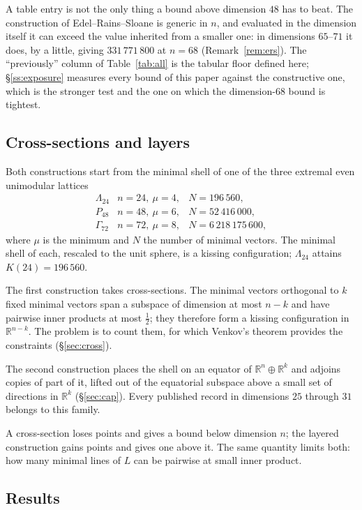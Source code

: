 \documentclass[11pt]{amsart}
\theoremstyle{remark}
\newcommand{\Leech}{\Lambda_{24}}
\newcommand{\Pff}{P_{48}}
\newcommand{\Gsz}{\Gamma_{72}}
\newcommand{\R}{\mathbb{R}}
\begin{document}
A table entry is not the only thing a bound above dimension $48$ has to beat. The
construction of Edel--Rains--Sloane is generic in $n$, and evaluated in the dimension
itself it can exceed the value inherited from a smaller one: in dimensions $65$--$71$
it does, by a little, giving $331\,771\,800$ at $n=68$ (Remark~\ref{rem:ers}). The
``previously'' column of Table~\ref{tab:all} is the tabular floor defined here;
\S\ref{ss:exposure} measures every bound of this paper against the constructive one,
which is the stronger test and the one on which the dimension-$68$ bound is tightest.

\subsection{Cross-sections and layers}

Both constructions start from the minimal shell of one of the three extremal
even unimodular lattices
\[
\begin{array}{lll}
  \Leech & n=24,\ \mu=4, & N=196\,560,\\
  \Pff   & n=48,\ \mu=6, & N=52\,416\,000,\\
  \Gsz   & n=72,\ \mu=8, & N=6\,218\,175\,600,
\end{array}
\]
where $\mu$ is the minimum and $N$ the number of minimal vectors. The minimal
shell of each, rescaled to the unit sphere, is a kissing configuration; $\Leech$
attains $K(24)=196\,560$.

The first construction takes cross-sections. The minimal vectors orthogonal to
$k$ fixed minimal vectors span a subspace of dimension at most $n-k$ and have
pairwise inner products at most $\tfrac12$; they therefore form a kissing
configuration in $\R^{n-k}$. The problem is to count them, for which Venkov's
theorem provides the constraints (\S\ref{sec:cross}).

The second construction places the shell on an equator of $\R^{n}\oplus\R^{k}$
and adjoins copies of part of it, lifted out of the equatorial subspace above a
small set of directions in $\R^{k}$ (\S\ref{sec:cap}). Every published record in
dimensions $25$ through $31$ belongs to this family.

A cross-section loses points and gives a bound below dimension $n$; the layered
construction gains points and gives one above it. The same quantity limits both:
how many minimal lines of $L$ can be pairwise at small inner product.

\subsection{Results}
\end{document}

